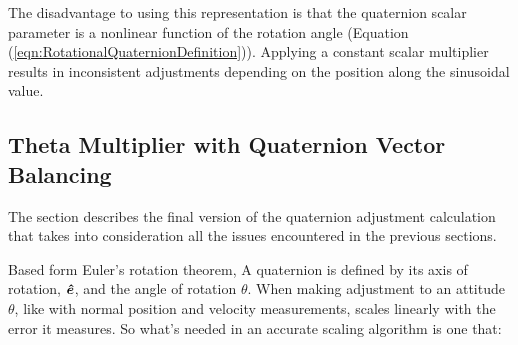 The disadvantage to using this representation is that the quaternion scalar parameter is a nonlinear function of the rotation angle (Equation (\ref{eqn:RotationalQuaternionDefinition})).  Applying a constant scalar multiplier results in inconsistent adjustments depending on the position along the sinusoidal value.

\subsection{Theta Multiplier with Quaternion Vector Balancing}
\label{subsec:ThetaMultiplierWithQuaternionVectorBalancing}

The section describes the final version of the quaternion adjustment calculation that takes into consideration all the issues encountered in the previous sections.


Based form Euler's rotation theorem, A quaternion is defined by its axis of rotation, $\boldsymbol{\hat{e}}$, and the angle of rotation $\theta$.  When making adjustment to an attitude $\theta$, like with normal position and velocity measurements, scales linearly with the error it measures.  So what's needed in an accurate scaling algorithm is one that:

